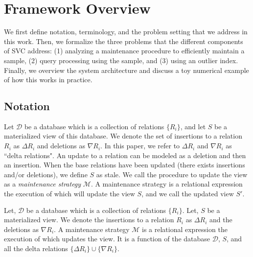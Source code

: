 \section{Framework Overview}\label{sec-arch}
We first define notation, terminology, and the problem setting that we address in this work.
Then, we formalize the three problems that the different components of SVC address: (1) analyzing a maintenance procedure to efficiently maintain a sample, (2) query processing using the sample, and (3) using an outlier index.
Finally, we overview the system architecture and discuss a toy numerical example of how this works in practice.

\subsection{Notation}
Let $\mathcal{D}$ be a database which is a collection of relations $\{R_i\}$, and let $S$ be a materialized view of this database.
We denote the set of insertions to a relation $R_i$ as $\Delta R_i$ and deletions as $\nabla R_i$.
In this paper, we refer to $\Delta R_i$ and $\nabla R_i$ as ``delta relations".
An update to a relation can be modeled as a deletion and then an insertion.
When the base relations have been updated (there exists insertions and/or deletions), we define $S$ as stale.
We call the procedure to update the view as a \emph{maintenance strategy} $\mathcal{M}$.
A maintenance strategy is a relational expression the execution of which will update the view $S$, and we call the updated view $S'$.

\begin{definition}
Let, $\mathcal{D}$ be a database which is a collection of relations $\{R_i\}$.
Let, $S$ be a materialized view.
We denote the insertions to a relation $R_i$ as $\Delta R_i$ and the deletions as $\nabla R_i$.
A maintenance strategy $\mathcal{M}$ is a relational expression the execution of which updates the view.
It is a function of the database $\mathcal{D}$, $S$, and all the delta relations $\{\Delta R_i\} \cup \{\nabla R_i\}$.
\end{definition}


